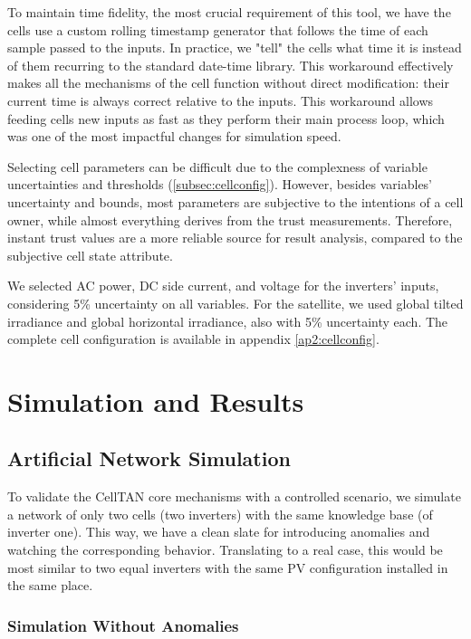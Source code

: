 To maintain time fidelity, the most crucial requirement of this tool, we have the cells use a custom rolling timestamp generator that follows the time of each sample passed to the inputs. In practice, we "tell" the cells what time it is instead of them recurring to the standard date-time library. This workaround effectively makes all the mechanisms of the cell function without direct modification: their current time is always correct relative to the inputs. This workaround allows feeding cells new inputs as fast as they perform their main process loop, which was one of the most impactful changes for simulation speed.

Selecting cell parameters can be difficult due to the complexness of variable uncertainties and thresholds (\ref{subsec:cellconfig}). However, besides variables' uncertainty and bounds, most parameters are subjective to the intentions of a cell owner, while almost everything derives from the trust measurements. Therefore, instant trust values are a more reliable source for result analysis, compared to the subjective cell state attribute.

We selected AC power, DC side current, and voltage for the inverters' inputs, considering 5\% uncertainty on all variables. For the satellite, we used global tilted irradiance and global horizontal irradiance, also with 5\% uncertainty each. The complete cell configuration is available in appendix \ref{ap2:cellconfig}.


\section{Simulation and Results} \label{subsec:results}

\subsection{Artificial Network Simulation}

To validate the CellTAN core mechanisms with a controlled scenario, we simulate a network of only two cells (two inverters) with the same knowledge base (of inverter one). This way, we have a clean slate for introducing anomalies and watching the corresponding behavior. Translating to a real case, this would be most similar to two equal inverters with the same PV configuration installed in the same place.

\subsubsection{Simulation Without Anomalies}  \label{subsubsec:simnoanom}


